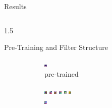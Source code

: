 \documentclass[final]{beamer}
\newlength{\onecolwid}
\newlength{\threecolwid}
\begin{document}
\begin{frame}[t]
\begin{columns}[t]
\begin{column}{\threecolwid}
\begin{alertblock}{Results}
\begin{columns}[t]
\begin{column}{1.5\onecolwid}
\begin{block}{Pre-Training and Filter Structure}
\begin{figure}
\begin{subfigure}{.4\linewidth}
					\includegraphics[width=0.1\linewidth]{graphics/cifar_filters/pre_trained_18.png}
					\caption{pre-trained}
				\end{subfigure}
				\begin{subfigure}{.4\linewidth}
					\centering
					\includegraphics[width=0.1\linewidth]{graphics/cifar_filters/random_01.png} 
					\includegraphics[width=0.1\linewidth]{graphics/cifar_filters/random_02.png} %
					\includegraphics[width=0.1\linewidth]{graphics/cifar_filters/random_03.png}
					\includegraphics[width=0.1\linewidth]{graphics/cifar_filters/random_04.png} %
					\includegraphics[width=0.1\linewidth]{graphics/cifar_filters/random_05.png} %
					\includegraphics[width=0.1\linewidth]{graphics/cifar_filters/random_06.png} \\
					\includegraphics[width=0.1\linewidth]{graphics/cifar_filters/random_07.png} %

\end{subfigure}
\end{figure}
\end{block}
\end{column}
\end{columns}
\end{alertblock}
\end{column}
\end{columns}
\end{frame}
\end{document}
